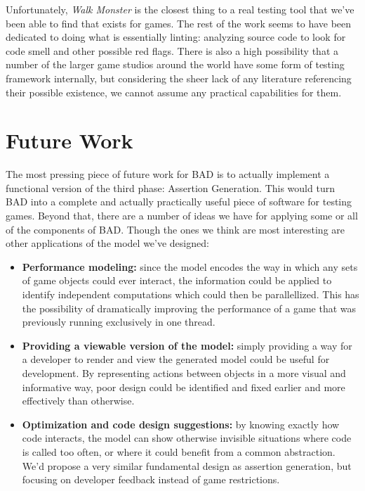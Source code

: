 \documentclass[letterpaper,twocolumn,10pt]{article}
\begin{document}
Unfortunately, \textit{Walk Monster} is the closest thing to a real testing tool that we've been able to find that exists for games. The rest of the work seems to have been dedicated to doing what is essentially linting: analyzing source code to look for code smell and other possible red flags. There is also a high possibility that a number of the larger game studios around the world have some form of testing framework internally, but considering the sheer lack of any literature referencing their possible existence, we cannot assume any practical capabilities for them.\\

\section{Future Work}

The most pressing piece of future work for BAD is to actually implement a functional version of the third phase: Assertion Generation. This would turn BAD into a complete and actually practically useful piece of software for testing games. Beyond that, there are a number of ideas we have for applying some or all of the components of BAD. Though the ones we think are most interesting are other applications of the model we've designed:

\begin{itemize}
    \item{\textbf{Performance modeling:}} since the model encodes the way in which any sets of game objects could ever interact, the information could be applied to identify independent computations which could then be parallellized. This has the possibility of dramatically improving the performance of a game that was previously running exclusively in one thread.  
    \item {\textbf{Providing a viewable version of the model:}} simply providing a way for a developer to render and view the generated model could be useful for development. By representing actions between objects in a more visual and informative way, poor design could be identified and fixed earlier and more effectively than otherwise.
    \item{\textbf{Optimization and code design suggestions:}} by knowing exactly how code interacts, the model can show otherwise invisible situations where code is called too often, or where it could benefit from a common abstraction. We'd propose a very similar fundamental design as assertion generation, but focusing on developer feedback instead of game restrictions.
\end{itemize}
\end{document}
